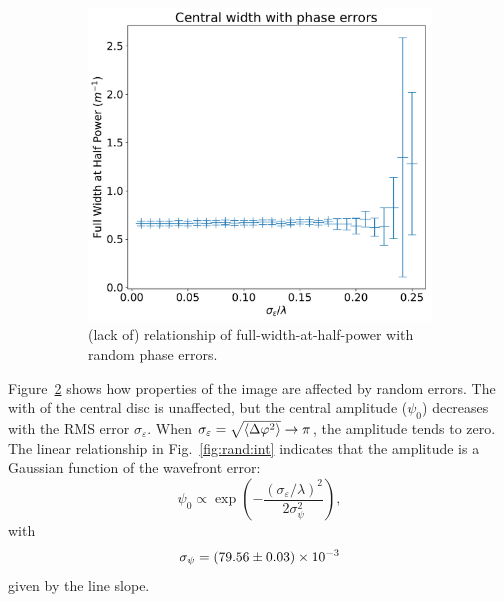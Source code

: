 \documentclass[11pt]{article}
\newcommand{\eps}{\varepsilon}
\newcommand{\ph}{\varphi}
\begin{document}
\begin{figure}
\begin{subfigure}{0.45\textwidth}
        \includegraphics[width=\textwidth]{pictures/rand/size}
        \caption{(lack of) relationship of full-width-at-half-power with random phase errors.}\label{fig:rand:size}
    \end{subfigure}
    \caption{}\label{fig:rand}
\end{figure}

Figure~\ref{fig:rand} shows how properties of the image are affected by random errors. The with of the central disc is unaffected, but the central amplitude ($\psi_0$) decreases with the RMS error $\sigma_\eps$. When $\sigma_\eps = \sqrt{\expval{\Delta\ph^2}} \rightarrow \pi$, the amplitude tends to zero. The linear relationship in Fig.~\ref{fig:rand:int} indicates that the amplitude is a Gaussian function of the wavefront error:
\begin{equation}
    \psi_0 \propto \exp \left( - \frac{(\sigma_\eps / \lambda)^2}{2 \sigma_\psi^2} \right),
\end{equation}
with
\begin{equation}
    \sigma_\psi = \num{79.56 \pm 0.03 e-3}
\end{equation}
given by the line slope.
\end{document}
